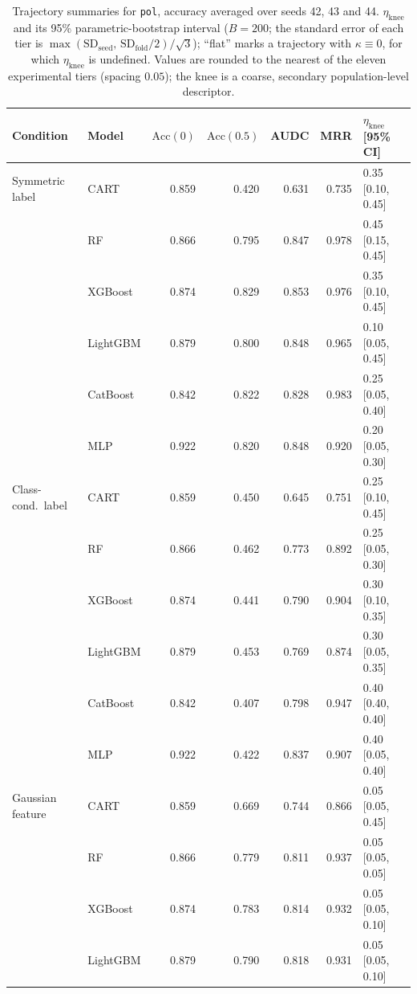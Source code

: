 \begin{table}[p]
\centering
\scriptsize
\setlength{\tabcolsep}{3.5pt}
\caption{Trajectory summaries for \texttt{pol}, accuracy averaged over seeds 42, 43 and 44. $\eta_{\mathrm{knee}}$ and its 95\% parametric-bootstrap interval ($B=200$; the standard error of each tier is $\max(\mathrm{SD}_{\mathrm{seed}},\,\mathrm{SD}_{\mathrm{fold}}/2)/\sqrt3$); ``flat'' marks a trajectory with $\kappa\equiv 0$, for which $\eta_{\mathrm{knee}}$ is undefined. Values are rounded to the nearest of the eleven experimental tiers (spacing $0.05$); the knee is a coarse, secondary population-level descriptor.}
\label{tab:traj_pol}
\begin{tabular}{@{}llrrrrl@{}}
\toprule
Condition & Model & $\mathrm{Acc}(0)$ & $\mathrm{Acc}(0.5)$ & AUDC & MRR & $\eta_{\mathrm{knee}}$ [95\% CI] \\
\midrule
Symmetric label & CART & 0.859 & 0.420 & 0.631 & 0.735 & 0.35 [0.10, 0.45] \\
 & RF & 0.866 & 0.795 & 0.847 & 0.978 & 0.45 [0.15, 0.45] \\
 & XGBoost & 0.874 & 0.829 & 0.853 & 0.976 & 0.35 [0.10, 0.45] \\
 & LightGBM & 0.879 & 0.800 & 0.848 & 0.965 & 0.10 [0.05, 0.45] \\
 & CatBoost & 0.842 & 0.822 & 0.828 & 0.983 & 0.25 [0.05, 0.40] \\
 & MLP & 0.922 & 0.820 & 0.848 & 0.920 & 0.20 [0.05, 0.30] \\
\midrule
Class-cond.\ label & CART & 0.859 & 0.450 & 0.645 & 0.751 & 0.25 [0.10, 0.45] \\
 & RF & 0.866 & 0.462 & 0.773 & 0.892 & 0.25 [0.05, 0.30] \\
 & XGBoost & 0.874 & 0.441 & 0.790 & 0.904 & 0.30 [0.10, 0.35] \\
 & LightGBM & 0.879 & 0.453 & 0.769 & 0.874 & 0.30 [0.05, 0.35] \\
 & CatBoost & 0.842 & 0.407 & 0.798 & 0.947 & 0.40 [0.40, 0.40] \\
 & MLP & 0.922 & 0.422 & 0.837 & 0.907 & 0.40 [0.05, 0.40] \\
\midrule
Gaussian feature & CART & 0.859 & 0.669 & 0.744 & 0.866 & 0.05 [0.05, 0.45] \\
 & RF & 0.866 & 0.779 & 0.811 & 0.937 & 0.05 [0.05, 0.05] \\
 & XGBoost & 0.874 & 0.783 & 0.814 & 0.932 & 0.05 [0.05, 0.10] \\
 & LightGBM & 0.879 & 0.790 & 0.818 & 0.931 & 0.05 [0.05, 0.10] \\

\end{tabular}
\end{table}
